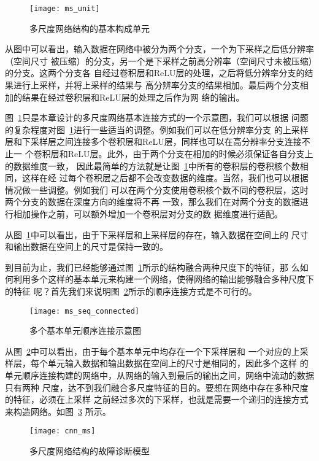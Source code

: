 \begin{figure}[ht]
  \centering
  \texttt{[image: ms\_unit]}
  \caption{多尺度网络结构的基本构成单元}
  \label{fig:ms_unit}
\end{figure}

从图中可以看出，输入数据在网络中被分为两个分支，一个为下采样之后低分辨率（空间尺寸
被压缩）的分支，另一个是下采样之前高分辨率（空间尺寸未被压缩）的分支。这两个分支各
自经过卷积层和ReLU层的处理，之后将低分辨率分支的结果进行上采样，并将上采样的结果与
高分辨率分支的结果相加。最后两个分支相加的结果在经过卷积层和ReLU层的处理之后作为网
络的输出。

图~\ref{fig:ms_unit}只是本章设计的多尺度网络基本连接方式的一个示意图，我们可以根据
问题的复杂程度对图~\ref{fig:ms_unit}进行一些适当的调整。例如我们可以在低分辨率分支
的上采样层和下采样层之间连接多个卷积层和ReLU层，同样也可以在高分辨率分支连接不止一
个卷积层和ReLU层。此外，由于两个分支在相加的时候必须保证各自分支上的数据维度一致，
因此最简单的方法就是让图~\ref{fig:ms_unit}中所有的卷积层的卷积核个数相同，这样在经
过每个卷积层之后都不会改变数据的维度。当然，我们也可以根据情况做一些调整。例如我们
可以在两个分支使用卷积核个数不同的卷积层，这时两个分支的数据在深度方向的维度将不再
一致，那么我们在对两个分支的数据进行相加操作之前，可以额外增加一个卷积层对分支的数
据维度进行适配。

从图~\ref{fig:ms_unit}中可以看出，由于下采样层和上采样层的存在，输入数据在空间上的
尺寸和输出数据在空间上的尺寸是保持一致的。

到目前为止，我们已经能够通过图~\ref{fig:ms_unit}所示的结构融合两种尺度下的特征，那
么如何利用多个这样的基本单元来构建一个网络，使得网络的输出能够融合多种尺度下的特征
呢？首先我们来说明图~\ref{fig:ms_seq_connected}所示的顺序连接方式是不可行的。
\begin{figure}[ht]
  \centering
  \texttt{[image: ms\_seq\_connected]}
  \caption{多个基本单元顺序连接示意图}
  \label{fig:ms_seq_connected}
\end{figure}

从图~\ref{fig:ms_seq_connected}中可以看出，由于每个基本单元中均存在一个下采样层和
一个对应的上采样层，每个单元输入数据和输出数据在空间上的尺寸是相同的，因此多个这样
的单元顺序连接构建的网络中，从网络的输入到最后的输出之间，网络中流动的数据只有两种
尺度，达不到我们融合多尺度特征的目的。要想在网络中存在多种尺度的特征，必须在上采样
之前经过多次的下采样，也就是需要一个递归的连接方式来构造网络。如图~\ref{fig:cnn_ms}
所示。
\begin{figure}[ht]
  \centering
  \texttt{[image: cnn\_ms]}
  \caption{多尺度网络结构的故障诊断模型}
  \label{fig:cnn_ms}
\end{figure}

